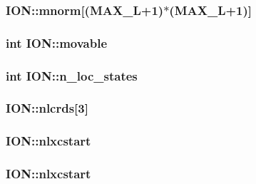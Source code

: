 \hypertarget{struct_i_o_n_adc70017bd33545a3d64fc01c4615feef}{
\subsubsection[{mnorm}]{ I\-O\-N\-::mnorm\mbox{[}({\bf M\-A\-X\-\_\-\-L}+1)$\ast$({\bf M\-A\-X\-\_\-\-L}+1)\mbox{]}}}\label{struct_i_o_n_adc70017bd33545a3d64fc01c4615feef}
\hypertarget{struct_i_o_n_abadac1a4be93446c54df8fb5e082113b}{
\subsubsection[{movable}]{\setlength{\rightskip}{0pt plus 5cm}int I\-O\-N\-::movable}}\label{struct_i_o_n_abadac1a4be93446c54df8fb5e082113b}
\hypertarget{struct_i_o_n_a76a436900c11bbe43958ca825f9882d9}{
\subsubsection[{n\-\_\-loc\-\_\-states}]{\setlength{\rightskip}{0pt plus 5cm}int I\-O\-N\-::n\-\_\-loc\-\_\-states}}\label{struct_i_o_n_a76a436900c11bbe43958ca825f9882d9}
\hypertarget{struct_i_o_n_a6599867716c4ee50bd98629e13c3fbdd}{
\subsubsection[{nlcrds}]{ I\-O\-N\-::nlcrds\mbox{[}3\mbox{]}}}\label{struct_i_o_n_a6599867716c4ee50bd98629e13c3fbdd}
\hypertarget{struct_i_o_n_a548b381a3e7eb1acbd8e1fe79f94e592}{
\subsubsection[{nlxcstart}]{ I\-O\-N\-::nlxcstart}}\label{struct_i_o_n_a548b381a3e7eb1acbd8e1fe79f94e592}
\hypertarget{struct_i_o_n_a68f67be3d43f58927caac3bc16af08bf}{
\subsubsection[{nlxcstart}]{ I\-O\-N\-::nlxcstart}}\label{struct_i_o_n_a68f67be3d43f58927caac3bc16af08bf}
